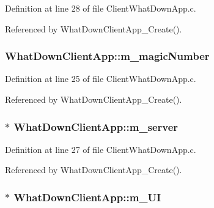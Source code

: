 Definition at line 28 of file Client\+What\+Down\+App.\+c.



Referenced by What\+Down\+Client\+App\+\_\+\+Create().

\subsubsection[{\texorpdfstring{m\+\_\+magic\+Number}{m_magicNumber}}]{ What\+Down\+Client\+App\+::m\+\_\+magic\+Number}\hypertarget{structWhatDownClientApp_af2a582f2bc2f3b90adf7dee77397d583}{}\label{structWhatDownClientApp_af2a582f2bc2f3b90adf7dee77397d583}


Definition at line 25 of file Client\+What\+Down\+App.\+c.



Referenced by What\+Down\+Client\+App\+\_\+\+Create().

\subsubsection[{\texorpdfstring{m\+\_\+server}{m_server}}]{$\ast$ What\+Down\+Client\+App\+::m\+\_\+server}\hypertarget{structWhatDownClientApp_acfe7a509130c7a3d12c3eeaa24639e14}{}\label{structWhatDownClientApp_acfe7a509130c7a3d12c3eeaa24639e14}


Definition at line 27 of file Client\+What\+Down\+App.\+c.



Referenced by What\+Down\+Client\+App\+\_\+\+Create().

\subsubsection[{\texorpdfstring{m\+\_\+\+UI}{m_UI}}]{$\ast$ What\+Down\+Client\+App\+::m\+\_\+\+UI}\hypertarget{structWhatDownClientApp_a8672f274e231d00df2a5e4cb1c5f43a1}{}\label{structWhatDownClientApp_a8672f274e231d00df2a5e4cb1c5f43a1}


